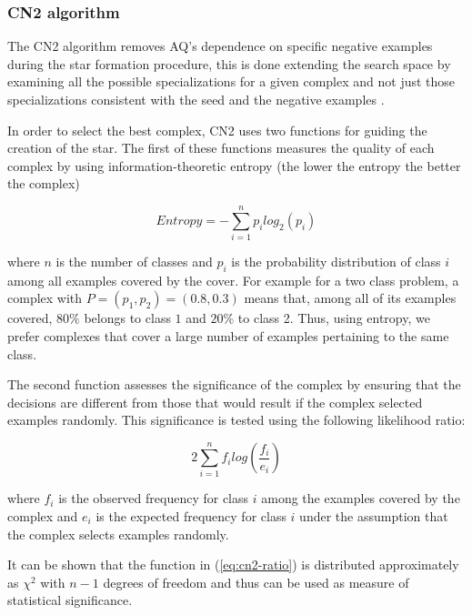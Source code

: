 \documentclass[preprint,3p,twocolumn]{elsarticle}
\begin{document}
\subsubsection{CN2 algorithm}
The CN2 algorithm removes AQ's dependence on specific negative examples during the star formation procedure, this is done extending the search space by examining all the possible specializations for a given complex and not just those specializations consistent with the seed and the negative examples \cite{CN2-Clark1989}.

In order to select the best complex, CN2 uses two functions for guiding the creation of the star. The first of these functions measures the quality of each complex by using information-theoretic entropy (the lower the entropy the better the complex)

\begin{equation} \label{eqn:cn2-entropy}
Entropy = - \sum_{i=1}^{n} p_{i} log_{2}(p_{i})
\end{equation}


where $n$ is the number of classes and $p_{i}$ is the probability distribution of class $i$ among all examples covered by the cover. For example for a two class problem, a complex with $P = (p_{1}, p_{2}) = (0.8, 0.3)$ means that, among all of its examples covered, $80\%$ belongs to class $1$ and $20\%$ to class 2.
Thus, using entropy, we prefer complexes that cover a large number of examples pertaining to the same class.

The second function assesses the significance of the complex by ensuring that the decisions are different from those that would result if the complex selected examples randomly. This significance is tested using the following likelihood ratio:

\begin{equation} \label{eq:cn2-ratio}
2 \sum_{i=1}^{n} f_{i} log \left( \frac{f_{i}}{e_{i}} \right) 
\end{equation}

where $f_{i}$ is the observed frequency for class $i$ among the examples covered by the complex and $e_{i}$ is the expected frequency for class $i$ under the assumption that the complex selects examples randomly.

It can be shown that the function in (\ref{eq:cn2-ratio}) is distributed approximately as $\chi^2$ with $n-1$ degrees of freedom and thus can be used as measure of statistical significance.
\end{document}
